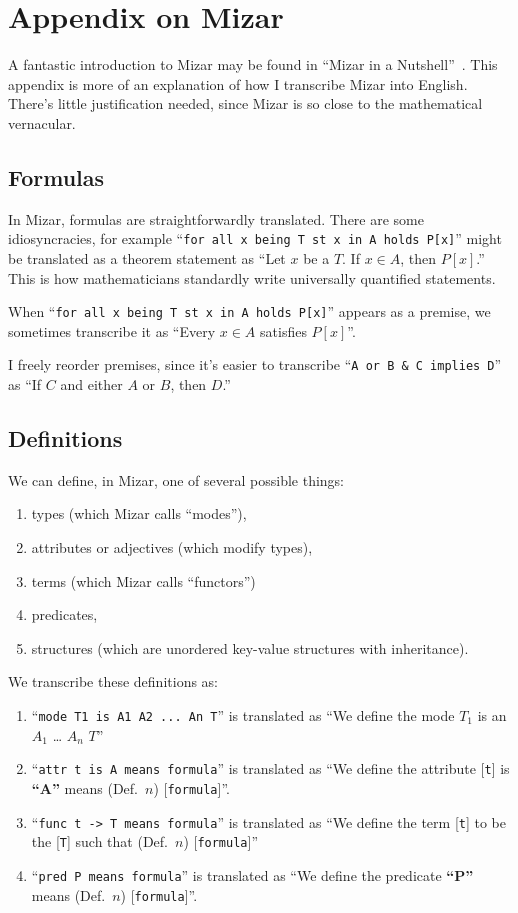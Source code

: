 \chapter{Appendix on Mizar}

A fantastic introduction to Mizar may be found in ``Mizar in a
Nutshell''~\cite{mizar-in-a-nutshell}.
This appendix is more of an explanation of how I transcribe Mizar into
English. There's little justification needed, since Mizar is so close to
the mathematical vernacular.

\section{Formulas}

In Mizar, formulas are straightforwardly translated. There are some
idiosyncracies, for example ``\verb#for all x being T st x in A holds P[x]#''
might be translated as a theorem statement as ``Let $x$ be a $T$.
If $x\in A$, then $P[x]$.'' This is how mathematicians standardly write
universally quantified statements.

When ``\verb#for all x being T st x in A holds P[x]#'' appears as a
premise, we sometimes transcribe it as ``Every $x\in A$ satisfies $P[x]$''.

I freely reorder premises, since it's easier to transcribe ``\texttt{A
  or B \&\ C implies D}'' as ``If $C$ and either $A$ or $B$, then $D$.''

\section{Definitions}

We can define, in Mizar, one of several possible things:
\begin{enumerate}
\item types (which Mizar calls ``modes''),
\item attributes or adjectives (which modify types),
\item terms (which Mizar calls ``functors'')
\item predicates,
\item structures (which are unordered key-value structures with inheritance).
\end{enumerate}

We transcribe these definitions as:
\begin{enumerate}
\item ``\verb#mode T1 is A1 A2 ... An T#''
  is translated as ``We define the mode $T_{1}$ is an $A_{1}$ \dots
  $A_{n}$ $T$''
\item ``\verb#attr t is A means formula#'' is translated as ``We define
  the attribute [\verb#t#] is \textbf{``A''} means (Def.\ $n$) [\verb#formula#]''.
\item ``\verb#func t -> T means formula#'' is translated as ``We define the
  term [\verb#t#] to be the [\verb#T#] such that (Def.\ $n$) [\verb#formula#]''
\item ``\verb#pred P means formula#'' is translated as ``We define the
  predicate \textbf{``P''} means (Def.\ $n$) [\verb#formula#]''.
\end{enumerate}

